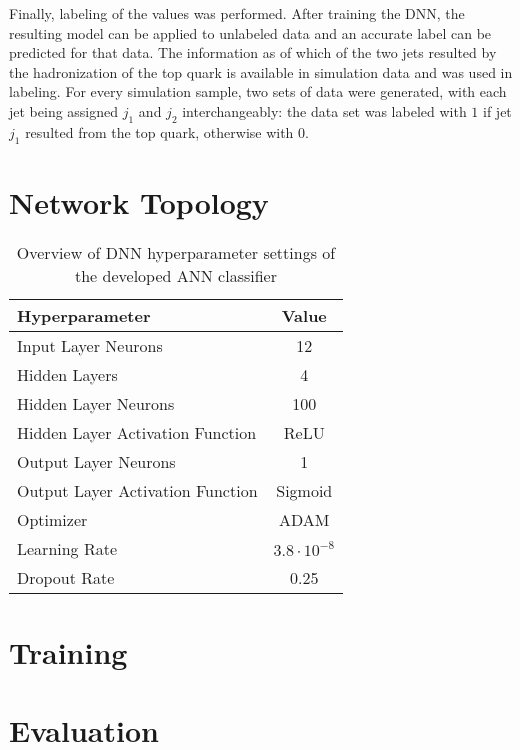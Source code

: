 Finally, labeling of the values was performed. After training the DNN, the resulting model can be applied to unlabeled data and an accurate label can be predicted for that data. The information as of which of the two jets resulted by the hadronization of the top quark is available in simulation data and was used in labeling. For every simulation sample, two sets of data were generated, with each jet being assigned $j_1$ and $j_2$ interchangeably: the data set was labeled with $1$ if jet $j_1$ resulted from the top quark, otherwise with $0$.

\section{Network Topology}
\label{sec:ch-5-network}

\begin{table}[h]
    \caption{Overview of DNN hyperparameter settings of the developed ANN classifier}
    \label{tab:ch_4_ann_topology}
    \begin{center}
        \begin{tabular}{lc}
            \hline
            Hyperparameter & Value\\
            \hline
            Input Layer Neurons & 12\\
            Hidden Layers & 4\\
            Hidden Layer Neurons & 100\\
            Hidden Layer Activation Function & ReLU\\
            Output Layer Neurons & 1\\
            Output Layer Activation Function & Sigmoid\\
            Optimizer & ADAM\\
            Learning Rate & $3.8 \cdot 10^{-8}$\\
            Dropout Rate & 0.25\\
            \hline
        \end{tabular}
    \end{center}
\end{table}

\section{Training}
\label{sec:ch-5-training}

\section{Evaluation}
\label{sec:ch-5-eval}